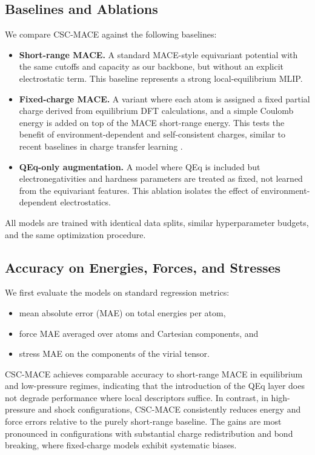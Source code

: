 \documentclass{article}
\begin{document}
\subsection{Baselines and Ablations}

We compare CSC-MACE against the following baselines:

\begin{itemize}
    \item \textbf{Short-range MACE.} A standard MACE-style equivariant potential \cite{batatia2022mace} with the same cutoffs and capacity as our backbone, but without an explicit electrostatic term. This baseline represents a strong local-equilibrium MLIP.
    \item \textbf{Fixed-charge MACE.} A variant where each atom is assigned a fixed partial charge derived from equilibrium DFT calculations, and a simple Coulomb energy is added on top of the MACE short-range energy. This tests the benefit of environment-dependent and self-consistent charges, similar to recent baselines in charge transfer learning \cite{wang2024charge3net}.
    \item \textbf{QEq-only augmentation.} A model where QEq is included but electronegativities and hardness parameters are treated as fixed, not learned from the equivariant features. This ablation isolates the effect of environment-dependent electrostatics.
\end{itemize}

All models are trained with identical data splits, similar hyperparameter budgets, and the same optimization procedure.

\subsection{Accuracy on Energies, Forces, and Stresses}

We first evaluate the models on standard regression metrics:
\begin{itemize}
    \item mean absolute error (MAE) on total energies per atom,
    \item force MAE averaged over atoms and Cartesian components, and
    \item stress MAE on the components of the virial tensor.
\end{itemize}

CSC-MACE achieves comparable accuracy to short-range MACE in equilibrium and low-pressure regimes, indicating that the introduction of the QEq layer does not degrade performance where local descriptors suffice. In contrast, in high-pressure and shock configurations, CSC-MACE consistently reduces energy and force errors relative to the purely short-range baseline. The gains are most pronounced in configurations with substantial charge redistribution and bond breaking, where fixed-charge models exhibit systematic biases.
\end{document}
